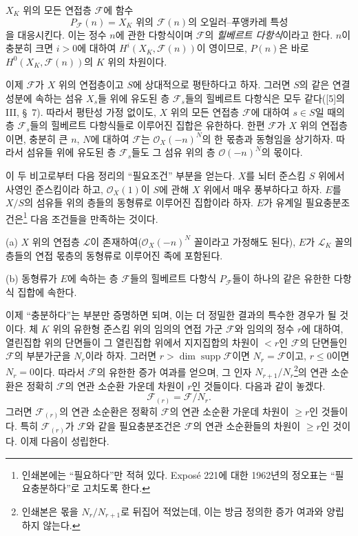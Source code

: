 $X_K$ 위의 모든 연접층 $\mathcal F$에 함수
\[
P_{\mathcal F}(n)=\text{$X_K$ 위의 $\mathcal F(n)$의
오일러--푸앵카레 특성}
\]
을 대응시킨다. 이는 정수 $n$에 관한 다항식이며 $\mathcal F$의
\emph{힐베르트 다항식}이라고 한다. $n$이 충분히 크면 $i>0$에 대하여
$H^i(X_K,\mathcal F(n))$이 영이므로, $P(n)$은 바로
$H^0(X_K,\mathcal F(n))$의 $K$ 위의 차원이다.

이제 $\mathcal F$가 $X$ 위의 연접층이고 $S$에 상대적으로 평탄하다고 하자.
그러면 $S$의 같은 연결 성분에 속하는 섬유 $X_s$들 위에 유도된 층
$\mathcal F_s$들의 힐베르트 다항식은 모두 같다([5]의 III, \S~7).
따라서 평탄성 가정 없이도, $X$ 위의 모든 연접층 $\mathcal F$에 대하여
$s\in S$일 때의 층 $\mathcal F_s$들의 힐베르트 다항식들로 이루어진
집합은 유한하다.
한편 $\mathcal F$가 $X$ 위의 연접층이면, 충분히 큰 $n$, $N$에 대하여
$\mathcal F$는 $\mathcal O_X(-n)^N$의 한 몫층과 동형임을 상기하자.
따라서 섬유들 위에 유도된 층 $\mathcal F_s$들도 그 섬유 위의 층
$\mathcal O(-n)^N$의 몫이다.

이 두 비고로부터 다음 정리의 ``필요조건'' 부분을 얻는다.
 $X$를 뇌터 준스킴 $S$ 위에서 사영인 준스킴이라 하고,
$\mathcal O_X(1)$이 $S$에 관해 $X$ 위에서 매우 풍부하다고 하자. $E$를
$X/S$의 섬유들 위의 층들의 동형류로 이루어진 집합이라 하자. $E$가
유계일 필요충분조건은\footnote{인쇄본에는 ``필요하다''만 적혀 있다.
Exposé 221에 대한 1962년의 정오표는 ``필요충분하다''로 고치도록 한다.}
다음 조건들을 만족하는 것이다.

\medskip
\noindent (a) $X$ 위의 연접층 $\mathcal L$이 존재하여($\mathcal
O_X(-n)^N$ 꼴이라고 가정해도 된다), $E$가 $\mathcal L_K$ 꼴의 층들의
연접 몫층의 동형류로 이루어진 족에 포함된다.

\smallskip
\noindent (b) 동형류가 $E$에 속하는 층 $\mathcal F$들의 힐베르트 다항식
$P_{\mathcal F}$들이 하나의 같은 유한한 다항식 집합에 속한다.

이제 ``충분하다''는 부분만 증명하면 되며, 이는 더 정밀한 결과의 특수한
경우가 될 것이다. 체 $K$ 위의 유한형 준스킴 위의 임의의 연접 가군
$\mathcal F$와 임의의 정수 $r$에 대하여, 열린집합 위의 단면들이 그
열린집합 위에서 지지집합의 차원이 $<r$인 $\mathcal F$의 단면들인
$\mathcal F$의 부분가군을 $N_r$이라 하자. 그러면
$r>\dim\operatorname{supp}\mathcal F$이면 $N_r=\mathcal F$이고,
$r\leq0$이면 $N_r=0$이다. 따라서 $\mathcal F$의 유한한 증가 여과를
얻으며, 그 인자 $N_{r+1}/N_r$\footnote{인쇄본은 몫을
$N_r/N_{r+1}$로 뒤집어 적었는데, 이는 방금 정의한 증가 여과와 양립하지
않는다.}의 연관 소순환은 정확히 $\mathcal F$의 연관 소순환 가운데
차원이 $r$인 것들이다. 다음과 같이 놓겠다.
\[
\mathcal F_{(r)}=\mathcal F/N_r.
\]
그러면 $\mathcal F_{(r)}$의 연관 소순환은 정확히 $\mathcal F$의 연관
소순환 가운데 차원이 $\geq r$인 것들이다. 특히 $\mathcal F_{(r)}$가
$\mathcal F$와 같을 필요충분조건은 $\mathcal F$의 연관 소순환들의
차원이 $\geq r$인 것이다. 이제 다음이 성립한다.

